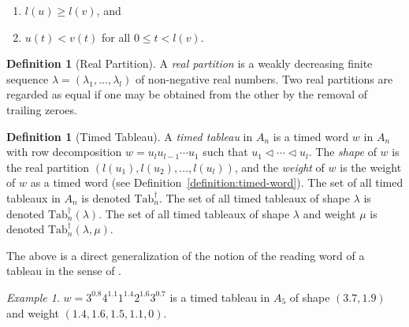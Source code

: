 \documentclass[10pt]{amsproc}
\theoremstyle{definition}
\newtheorem{definition}[theorem]{Definition}
\theoremstyle{remark}
\newtheorem{example}[theorem]{Example}
\newcommand{\ttab}{\mathrm{Tab}^\dagger}
\begin{document}
\begin{enumerate}
\item $l(u)\geq l(v)$, and
\item $u(t)<v(t)$ for all $0\leq t<l(v)$.
\end{enumerate}
\begin{definition}
  [Real Partition]\label{definition:real-partition}
  A \emph{real partition} is a weakly decreasing finite sequence $\lambda=(\lambda_1,\dotsc,\lambda_l)$ of non-negative real numbers.
  Two real partitions are regarded as equal if one may be obtained from the other by the removal of trailing zeroes.
\end{definition}
\begin{definition}[Timed Tableau]\label{definition:timed-tableau}
  A \emph{timed tableau} in $A_n$ is a timed word $w$ in $A_n$ with row decomposition $w=u_l u_{l-1}\dotsb u_1$ such that $u_1\lhd \dotsb \lhd u_l$.
  The \emph{shape} of $w$ is the real partition $(l(u_1),l(u_2),\dotsc,l(u_l))$, and the \emph{weight} of $w$ is the weight of $w$ as a timed word (see Definition~\ref{definition:timed-word}).
  The set of all timed tableaux in $A_n$ is denoted $\ttab_n$.
  The set of all timed tableaux of shape $\lambda$ is denoted $\ttab_n(\lambda)$.
  The set of all timed tableaux of shape $\lambda$ and weight $\mu$ is denoted $\ttab_n(\lambda,\mu)$.
\end{definition}
The above is a direct generalization of the notion of the reading word of a tableau in the sense of \cite{Lascoux}.
\begin{example}
  \label{example:timed-tableau}
  $w=3^{0.8}4^{1.1}1^{1.4}2^{1.6}3^{0.7}$ is a timed tableau in $A_5$ of shape $(3.7,1.9)$ and weight $(1.4, 1.6, 1.5, 1.1,0)$.
\end{example}
\end{document}
